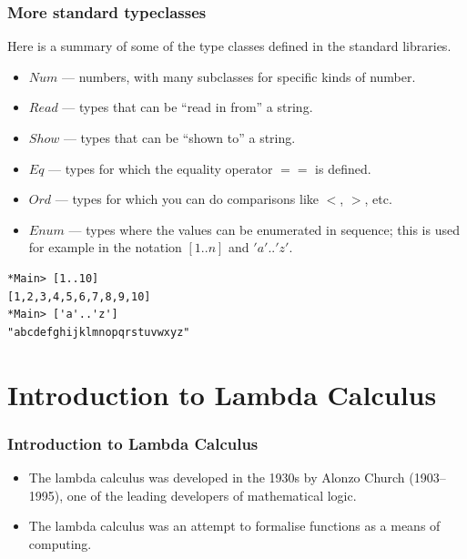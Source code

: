 \documentclass{beamer}
\begin{document}
\begin{frame}[fragile]
\frametitle{More standard typeclasses}

Here is a summary of some of the type classes defined in the
standard libraries.

\begin{itemize}
\item $Num$ --- numbers, with many subclasses for specific kinds of number.
\item $Read$ --- types that can be ``read in from'' a string.
\item $Show$ --- types that can be ``shown to'' a string.
\item $Eq$ --- types for which the equality operator $==$ is defined.
\item $Ord$ --- types for which you can do comparisons like $<$,
  $>$, etc.
\item $Enum$ --- types where the values can be enumerated in
  sequence; this is used for example in the notation $[1..n]$ and
  $'a'..'z'$.
\end{itemize}

\begin{verbatim}
*Main> [1..10]
[1,2,3,4,5,6,7,8,9,10]
*Main> ['a'..'z']
"abcdefghijklmnopqrstuvwxyz"
\end{verbatim}

\end{frame}

\section{Introduction to Lambda Calculus}

\begin{frame}[fragile]
\frametitle{Introduction to Lambda Calculus}

\begin{itemize}
\item The lambda calculus was developed in the 1930s by Alonzo
  Church (1903--1995), one of the leading developers of
  mathematical logic.
\item The lambda calculus was an attempt to formalise functions as
  a means of computing.
\end{itemize}

\end{frame}
\end{document}
